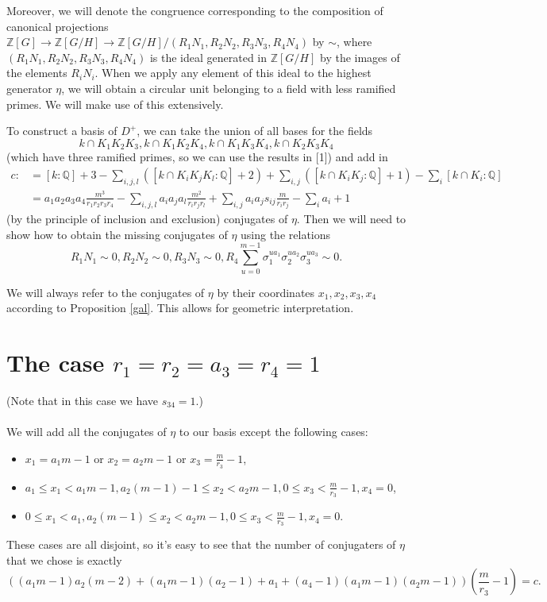 \documentclass[12pt,a4paper]{article}
\newcommand{\Q}{\mathbb{Q}}
\newcommand{\Z}{\mathbb{Z}}
\begin{document}
Moreover, we will denote the congruence corresponding to the composition of canonical projections $\Z[G]\to \Z[G/H]\to \Z[G/H]/(R_1N_1,R_2N_2,R_3N_3,R_4N_4)$ by $\sim$, where $(R_1N_1,R_2N_2,R_3N_3,R_4N_4)$ is the ideal generated in $\Z[G/H]$ by the images of the elements $R_iN_i$. When we apply any element of this ideal to the highest generator $\eta$, we will obtain a circular unit belonging to a field with less ramified primes. We will make use of this extensively.

To construct a basis of $D^+$, we can take the union of all bases for the fields $$k\cap K_1K_2K_3,k\cap K_1K_2K_4,k\cap K_1K_3K_4,k\cap K_2K_3K_4$$ (which have three ramified primes, so we can use the results in [1]) and add in
\begin{equation*}
\begin{split}
c:&=[k:\Q]+3-\sum_{i,j,l}([k\cap K_iK_jK_l:\Q]+2)+\sum_{i,j}([k\cap K_iK_j:\Q]+1)-\sum_{i}[k\cap K_i:\Q]\\&=a_1a_2a_3a_4\frac{m^3}{r_1r_2r_3r_4}-\sum_{i,j,l}a_ia_ja_l\frac{m^2}{r_ir_jr_l}+\sum_{i,j}
a_ia_js_{ij}\frac{m}{r_ir_j}-\sum_{i}a_i+1
\end{split}
\end{equation*}
(by the principle of inclusion and exclusion) conjugates of $\eta$. Then we will need to show how to obtain the missing conjugates of $\eta$ using the relations $$R_1N_1\sim 0, R_2N_2\sim 0, R_3N_3\sim 0, R_4\sum_{u=0}^{m-1}\sigma_1^{ua_1}\sigma_2^{ua_2}\sigma_3^{ua_3}\sim 0.$$

We will always refer to the conjugates of $\eta$ by their coordinates $x_1,x_2,x_3,x_4$ according to Proposition \ref{gal}. This allows for geometric interpretation.

\section{The case $r_1=r_2=a_3=r_4=1$}
(Note that in this case we have $s_{34}=1$.) %
\paragraph*{}
We will add all the conjugates of $\eta$ to our basis except the following cases:
\begin{itemize}
\item $x_1=a_1m-1$ or $x_2=a_2m-1$ or $x_3=\frac{m}{r_3}-1$,
\item $a_1\leq x_1 < a_1m-1, a_2(m-1)-1 \leq x_2 < a_2m-1, 0\leq x_3 < \frac{m}{r_3}-1, x_4=0$,
\item $0\leq x_1 < a_1, a_2(m-1) \leq x_2 < a_2m-1, 0\leq x_3 < \frac{m}{r_3}-1, x_4=0$.
\end{itemize}
These cases are all disjoint, so it's easy to see that the number of conjugaters of $\eta$ that we chose is exactly
$$((a_1m-1)a_2(m-2)+(a_1m-1)(a_2-1)+a_1+(a_4-1)(a_1m-1)(a_2m-1))\left(\frac{m}{r_3}-1\right)=c.$$
\end{document}
